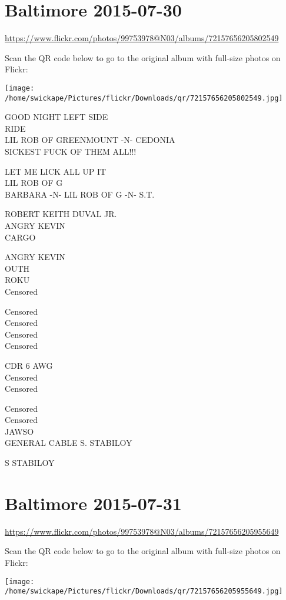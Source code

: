 \documentclass[10pt,letterpaper]{article}
\begin{document}
\section*{Baltimore 2015-07-30}

\url{https://www.flickr.com/photos/99753978@N03/albums/72157656205802549}

Scan the QR code below to go to the original album with full-size photos on Flickr:

\texttt{[image: /home/swickape/Pictures/flickr/Downloads/qr/72157656205802549.jpg]}


GOOD NIGHT LEFT SIDE\\
RIDE\\
LIL ROB OF GREENMOUNT {-}N{-} CEDONIA\\
SICKEST FUCK OF THEM ALL!!!

LET ME LICK ALL UP IT\\
LIL ROB OF G\\
BARBARA {-}N{-} LIL ROB OF G {-}N{-} S.T.

ROBERT KEITH DUVAL JR.\\
ANGRY KEVIN\\
CARGO

ANGRY KEVIN\\
OUTH\\
ROKU\\
Censored

Censored\\
Censored\\
Censored\\
Censored

CDR 6 AWG\\
Censored\\
Censored

Censored\\
Censored\\
JAWSO\\
GENERAL CABLE S. STABILOY

S STABILOY


\section*{Baltimore 2015-07-31}

\url{https://www.flickr.com/photos/99753978@N03/albums/72157656205955649}

Scan the QR code below to go to the original album with full-size photos on Flickr:

\texttt{[image: /home/swickape/Pictures/flickr/Downloads/qr/72157656205955649.jpg]}
\end{document}
